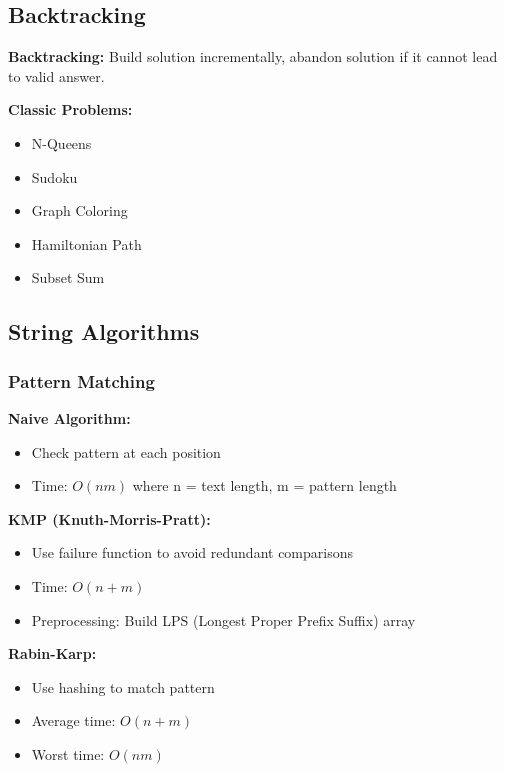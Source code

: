\documentclass[11pt,a4paper]{article}
\begin{document}
\subsection{Backtracking}

\begin{defbox}
\textbf{Backtracking:} Build solution incrementally, abandon solution if it cannot lead to valid answer.
\end{defbox}

\textbf{Classic Problems:}
\begin{itemize}
    \item N-Queens
    \item Sudoku
    \item Graph Coloring
    \item Hamiltonian Path
    \item Subset Sum
\end{itemize}

\subsection{String Algorithms}

\subsubsection{Pattern Matching}

\textbf{Naive Algorithm:}
\begin{itemize}
    \item Check pattern at each position
    \item Time: $O(nm)$ where n = text length, m = pattern length
\end{itemize}

\textbf{KMP (Knuth-Morris-Pratt):}
\begin{itemize}
    \item Use failure function to avoid redundant comparisons
    \item Time: $O(n + m)$
    \item Preprocessing: Build LPS (Longest Proper Prefix Suffix) array
\end{itemize}

\textbf{Rabin-Karp:}
\begin{itemize}
    \item Use hashing to match pattern
    \item Average time: $O(n + m)$
    \item Worst time: $O(nm)$
\end{itemize}
\end{document}
